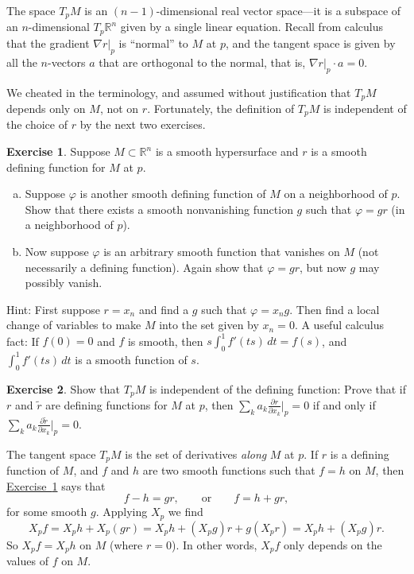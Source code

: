 \documentclass[12pt,openany]{book}
\newcommand{\R}{{\mathbb{R}}}
\theoremstyle{plain}
\theoremstyle{remark}
\theoremstyle{definition}
\newenvironment{exbox}{%
    \def\FrameCommand{\vrule width 1pt \relax\hspace{10pt}}%
    \MakeFramed{\advance\hsize-\width\FrameRestore}%
}{%
    \endMakeFramed
}
\newenvironment{exparts}{%
    \leavevmode\begin{enumerate}[a),noitemsep,topsep=0pt,parsep=0pt,partopsep=0pt]
}{%
    \end{enumerate}
}
\theoremstyle{exercise}
\newtheorem{exercise}{Exercise}[section]
\theoremstyle{example}
\newcommand{\exerciseref}[1]{\hyperref[#1]{Exercise~\ref*{#1}}}
\begin{document}
The space $T_pM$ is an $(n-1)$-dimensional real vector space---it is a subspace
of an $n$-dimensional $T_p\R^n$ given by a single linear equation.
Recall from calculus that the gradient $\nabla r|_p$ is
``normal'' to $M$ at $p$, and
the tangent space is given by all the $n$-vectors $a$
that are orthogonal to the normal, that is, $\nabla r|_p \cdot a = 0$.

\pagebreak[1]
We cheated in the terminology, and assumed without justification that $T_pM$
depends only on $M$, not on $r$.
Fortunately, the definition of $T_pM$ is independent of the choice of $r$ by the next two
exercises.

\begin{exbox}
\begin{exercise} \label{exercise:smoothdivision}
Suppose $M \subset \R^n$ is a smooth hypersurface and
$r$ is a smooth defining function for $M$ at $p$.
\begin{exparts}
\item
Suppose $\varphi$ is another
smooth defining function of $M$ on a neighborhood of $p$.
Show that there exists a smooth nonvanishing function $g$ such that
$\varphi = g r$ (in a neighborhood of $p$).
\item
Now suppose $\varphi$ is an arbitrary smooth function that vanishes on $M$ (not
necessarily a defining function).
Again show that $\varphi = g r$, but now $g$ may possibly vanish.
\end{exparts}
\nopagebreak
Hint: First suppose $r=x_n$ and
find a $g$ such that $\varphi = x_n g$.  Then find
a local change of variables to make $M$ into the set given by $x_n = 0$.
A useful calculus fact:
If $f(0) = 0$ and $f$ is smooth, then
$s \int_0^1 f'(ts) \,dt = f(s)$,
and $\int_0^1 f'(ts) \,dt$ is a smooth function of $s$.
\end{exercise}

\begin{exercise}
Show that $T_pM$ is independent of the defining function:
Prove that if $r$ and $\tilde{r}$ are defining functions for $M$ at $p$, then
$\sum_k a_k \frac{\partial r}{\partial x_k} \big|_p = 0$
if and only if
$\sum_k a_k \frac{\partial \tilde{r}}{\partial x_k} \big|_p = 0$.
\end{exercise}
\end{exbox}

The tangent space $T_p M$ is the set of derivatives
\emph{along} $M$ at $p$.  If $r$ is a defining function of $M$, and $f$ and $h$
are two smooth functions such that $f=h$ on $M$, then
\exerciseref{exercise:smoothdivision}
says that
\begin{equation*}
f-h = g r, \qquad \text{or} \qquad
f = h + g r,
\end{equation*}
for some smooth $g$.  Applying $X_p$ we find
\begin{equation*}
X_p f =
X_p h + X_p (gr) =
X_p h + (X_p g)r + g(X_p r) =
X_p h + (X_p g)r.
\end{equation*}
So $X_p f = X_p h$ on $M$ (where $r=0$).  In other words, $X_p f$ only
depends on the values of $f$ on $M$.
\end{document}
